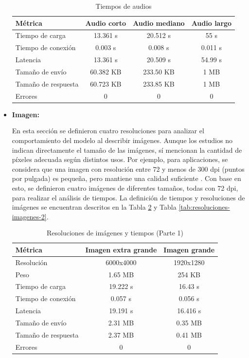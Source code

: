 \documentclass[lettersize,journal]{IEEEtran}
\begin{document}
\begin{itemize}
	\begin{table}[ht]
		\centering
		\caption{Tiempos de audios}
		\label{tab:tiempos-audios}
		\begin{tabular}{|l|c|c|c|}
			\hline
			\textbf{Métrica} & \textbf{Audio corto} & \textbf{Audio mediano} & \textbf{Audio largo} \\
			\hline
			Tiempo de carga & 13.361 s & 20.512 s & 55 s \\
			\hline
			Tiempo de conexión & 0.003 s & 0.008 s & 0.011 s \\
			\hline
			Latencia & 13.361 s & 20.509 s & 54.99 s \\
			\hline
			Tamaño de envío & 60.382 KB & 233.50 KB & 1 MB \\
			\hline
			Tamaño de respuesta & 60.723 KB & 233.85 KB & 1 MB \\
			\hline
			Errores & 0 & 0 & 0 \\
			\hline
		\end{tabular}
		\vspace{0.2cm}
	\end{table}
		
	\item \textbf{Imagen:} 
	
	\noindent En esta sección se definieron cuatro resoluciones para analizar el comportamiento del modelo al describir imágenes. Aunque los estudios no indican directamente el tamaño de las imágenes, sí mencionan la cantidad de píxeles adecuada según distintos usos. Por ejemplo, para aplicaciones, se considera que una imagen con resolución entre 72 y menos de 300 dpi (puntos por pulgada) es pequeña, pero mantiene una calidad suficiente \cite{Bieniecki2007,Mohamed2010}. Con base en esto, se definieron cuatro imágenes de diferentes tamaños, todas con 72 dpi, para realizar el análisis de tiempos. La definición de tiempos y resoluciones de imágenes se encuentran descritos en la Tabla \ref{tab:resoluciones-imagenes-1} y Tabla \ref{tab:resoluciones-imagenes-2}.	
	
	\begin{table}[ht]
		\centering
		\caption{Resoluciones de imágenes y tiempos (Parte 1)}
		\label{tab:resoluciones-imagenes-1}
		\begin{tabular}{|l|c|c|}
			\hline
			\textbf{Métrica} & \textbf{Imagen extra grande} & \textbf{Imagen grande} \\
			\hline
			Resolución & 6000x4000 & 1920x1280 \\
			\hline
			Peso & 1.65 MB & 254 KB \\
			\hline
			Tiempo de carga & 19.222 s & 16.43 s \\
			\hline
			Tiempo de conexión & 0.057 s & 0.056 s \\
			\hline
			Latencia & 19.191 s & 16.416 s \\
			\hline
			Tamaño de envío & 2.31 MB & 0.35 MB \\
			\hline
			Tamaño de respuesta & 2.37 MB & 0.41 MB \\
			\hline
			Errores & 0 & 0 \\
			\hline
		\end{tabular}
		\vspace{0.0cm}
	\end{table}
	

\end{itemize}
\end{document}
